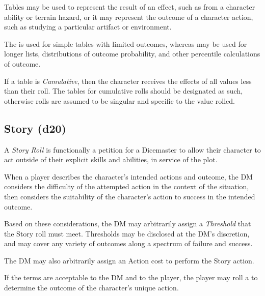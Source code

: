 \vspace{0.4em}

Tables may be used to represent the result of an effect, 
such as from a character ability or terrain hazard,
or it may represent the outcome of a character action, 
such as studying a particular artifact or environment.

\vspace{0.4em}

The  is used for simple tables with limited outcomes, 
whereas  may be used for longer lists,
distributions of outcome probability, 
and other percentile calculations of outcome.

\vspace{0.4em}

If a table is \textit{Cumulative}, then the character receives the effects of all values less than their roll.
The tables for cumulative rolls should be designated as such, 
otherwise rolls are assumed to be singular and specific to the value rolled.


\subsection{Story (d20)}
A \textit{Story Roll} is functionally a petition for a Dicemaster 
to allow their character to act outside of their explicit 
skills and abilities, in service of the plot.

\vspace{0.4em}

When a player describes the character's intended actions and outcome,
the DM considers the difficulty of the attempted action in the context of the situation,
then considers the suitability of the character's action to success in the intended outcome.

\vspace{0.4em}

Based on these considerations, 
the DM may arbitrarily assign a \textit{Threshold} 
that the Story roll must meet.
Thresholds may be disclosed at the DM's discretion, 
and may cover any variety of outcomes along a spectrum of failure and success.

\vspace{0.4em}

The DM may also arbitrarily assign an Action cost to perform the Story action.

\vspace{0.4em}

If the terms are acceptable to the DM and to the player, 
the player may roll a  to determine the outcome 
of the character's unique action.



